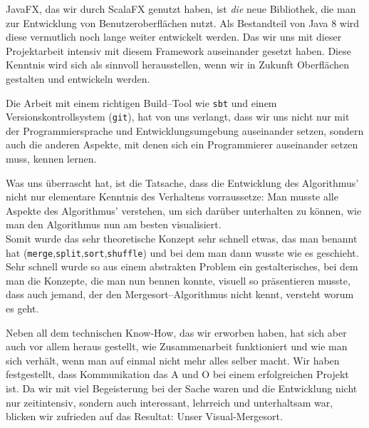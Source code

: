 JavaFX, das wir durch ScalaFX genutzt haben, ist \textit{die} neue Bibliothek, die man zur Entwicklung von Benutzeroberflächen nutzt. Als Bestandteil von Java 8 wird diese vermutlich noch lange weiter entwickelt werden. Das wir uns mit dieser Projektarbeit intensiv mit diesem Framework auseinander gesetzt haben. Diese Kenntnis wird sich als sinnvoll herausstellen, wenn wir in Zukunft Oberflächen gestalten und entwickeln werden.

Die Arbeit mit einem richtigen Build--Tool wie \texttt{sbt} und einem Versionskontrollsystem (\texttt{git}), hat von uns verlangt, dass wir uns nicht nur mit der Programmiersprache und Entwicklungsumgebung auseinander setzen, sondern auch die anderen Aspekte, mit denen sich ein Programmierer auseinander setzen muss, kennen lernen.

Was uns überrascht hat, ist die Tatsache, dass die Entwicklung des Algorithmus' nicht nur elementare Kenntnis des Verhaltens vorraussetze: Man musste alle Aspekte des Algorithmus' verstehen, um sich darüber unterhalten zu können, wie man den Algorithmus nun am besten visualisiert.\\
Somit wurde das sehr theoretische Konzept sehr schnell etwas, das man benannt hat (\texttt{merge},\texttt{split},\texttt{sort},\texttt{shuffle}) und bei dem man dann wusste wie es geschieht. Sehr schnell wurde so aus einem abstrakten Problem ein gestalterisches, bei dem man die Konzepte, die man nun bennen konnte, visuell so präsentieren musste, dass auch jemand, der den Mergesort--Algorithmus nicht kennt, versteht worum es geht.

Neben all dem technischen Know-How, das wir erworben haben, hat sich aber auch vor allem heraus gestellt, wie Zusammenarbeit funktioniert und wie man sich verhält, wenn man auf einmal nicht mehr alles selber macht. Wir haben festgestellt, dass Kommunikation das A und O bei einem erfolgreichen Projekt ist. Da wir mit viel Begeisterung bei der Sache waren und die Entwicklung nicht nur zeitintensiv, sondern auch interessant, lehrreich und unterhaltsam war, blicken wir zufrieden auf das Resultat: Unser Visual-Mergesort.
